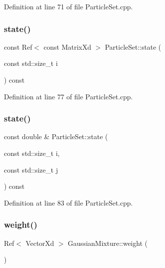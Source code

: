 Definition at line 71 of file Particle\+Set.\+cpp.

\mbox{\label{classbfl_1_1ParticleSet_a8867cf0347f12e0a4368d8daea832df9}} 
\subsubsection{\texorpdfstring{state()}{state()}\hspace{0.1cm}{\footnotesize\ttfamily [5/6]}}
{\footnotesize\ttfamily const Ref$<$ const Matrix\+Xd $>$ Particle\+Set\+::state (\begin{DoxyParamCaption}\item[{const std\+::size\+\_\+t}]{i }\end{DoxyParamCaption}) const}



Definition at line 77 of file Particle\+Set.\+cpp.

\mbox{\label{classbfl_1_1ParticleSet_ac3545004318c37e1ec73abb42bc72c71}} 
\subsubsection{\texorpdfstring{state()}{state()}\hspace{0.1cm}{\footnotesize\ttfamily [6/6]}}
{\footnotesize\ttfamily const double \& Particle\+Set\+::state (\begin{DoxyParamCaption}\item[{const std\+::size\+\_\+t}]{i,  }\item[{const std\+::size\+\_\+t}]{j }\end{DoxyParamCaption}) const}



Definition at line 83 of file Particle\+Set.\+cpp.

\mbox{\label{classbfl_1_1GaussianMixture_ada5625de6a3e2f98afb5aaa148503dad}} 
\subsubsection{\texorpdfstring{weight()}{weight()}\hspace{0.1cm}{\footnotesize\ttfamily [1/4]}}
{\footnotesize\ttfamily Ref$<$ Vector\+Xd $>$ Gaussian\+Mixture\+::weight (\begin{DoxyParamCaption}{ }\end{DoxyParamCaption})\hspace{0.3cm}{\ttfamily [inherited]}}



